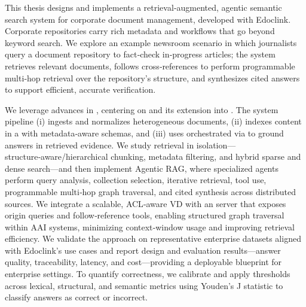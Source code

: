 \glsresetall
\noindent  
This thesis designs and implements a retrieval‑augmented, agentic semantic search system for corporate document management, developed with Edoclink. Corporate repositories carry rich metadata and workflows that go beyond keyword search.
We explore an example newsroom scenario in which journalists query a document repository to fact‑check in‑progress articles; the system retrieves relevant documents, follows cross‑references to perform programmable multi‑hop retrieval over the repository’s structure, and synthesizes cited answers to support efficient, accurate verification.

We leverage advances in , centering on  and its extension into . The system pipeline (i) ingests and normalizes heterogeneous documents, (ii) indexes content in a  with metadata‑aware schemas, and (iii) uses  orchestrated via  to ground answers in retrieved evidence. We study retrieval in isolation—structure‑aware/hierarchical chunking, metadata filtering, and hybrid sparse and dense search—and then implement Agentic RAG, where specialized agents perform query analysis, collection selection, iterative retrieval, tool use, programmable multi‑hop graph traversal, and cited synthesis across distributed sources.
We integrate a scalable, ACL‑aware \gls{VD} with an  server that exposes origin queries and follow‑reference tools, enabling structured graph traversal within \gls{AAI} systems, minimizing context‑window usage and improving retrieval efficiency. We validate the approach on representative enterprise datasets aligned with Edoclink’s use cases and report design and evaluation results—answer quality, traceability, latency, and cost—providing a deployable blueprint for enterprise settings. To quantify correctness, we calibrate and apply thresholds across lexical, structural, and semantic metrics using Youden’s J statistic to classify answers as correct or incorrect.






